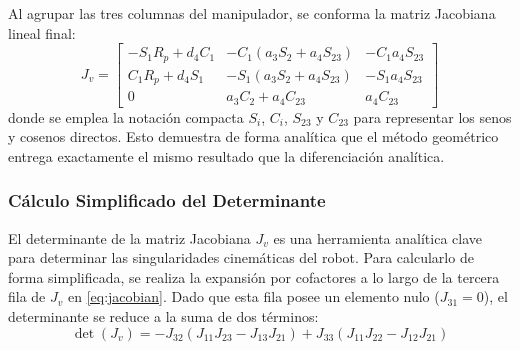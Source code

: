 \documentclass[conference,a4paper]{IEEEtran}
\begin{document}
Al agrupar las tres columnas del manipulador, se conforma la matriz Jacobiana lineal final:
\begin{equation}
J_v = \begin{bmatrix} -S_1 R_p + d_4 C_1 & -C_1(a_3 S_2 + a_4 S_{23}) & -C_1 a_4 S_{23} \\ C_1 R_p + d_4 S_1 & -S_1(a_3 S_2 + a_4 S_{23}) & -S_1 a_4 S_{23} \\ 0 & a_3 C_2 + a_4 C_{23} & a_4 C_{23} \end{bmatrix}
\label{eq:jacobian}
\end{equation}
donde se emplea la notación compacta $S_i$, $C_i$, $S_{23}$ y $C_{23}$ para representar los senos y cosenos directos. Esto demuestra de forma analítica que el método geométrico entrega exactamente el mismo resultado que la diferenciación analítica.

\subsubsection{Cálculo Simplificado del Determinante}
El determinante de la matriz Jacobiana $J_v$ es una herramienta analítica clave para determinar las singularidades cinemáticas del robot. Para calcularlo de forma simplificada, se realiza la expansión por cofactores a lo largo de la tercera fila de $J_v$ en \eqref{eq:jacobian}. Dado que esta fila posee un elemento nulo ($J_{31} = 0$), el determinante se reduce a la suma de dos términos:
\begin{equation}
\det(J_v) = -J_{32} ( J_{11} J_{23} - J_{13} J_{21} ) + J_{33} ( J_{11} J_{22} - J_{12} J_{21} )
\label{eq:det_cofactores}
\end{equation}
\end{document}
